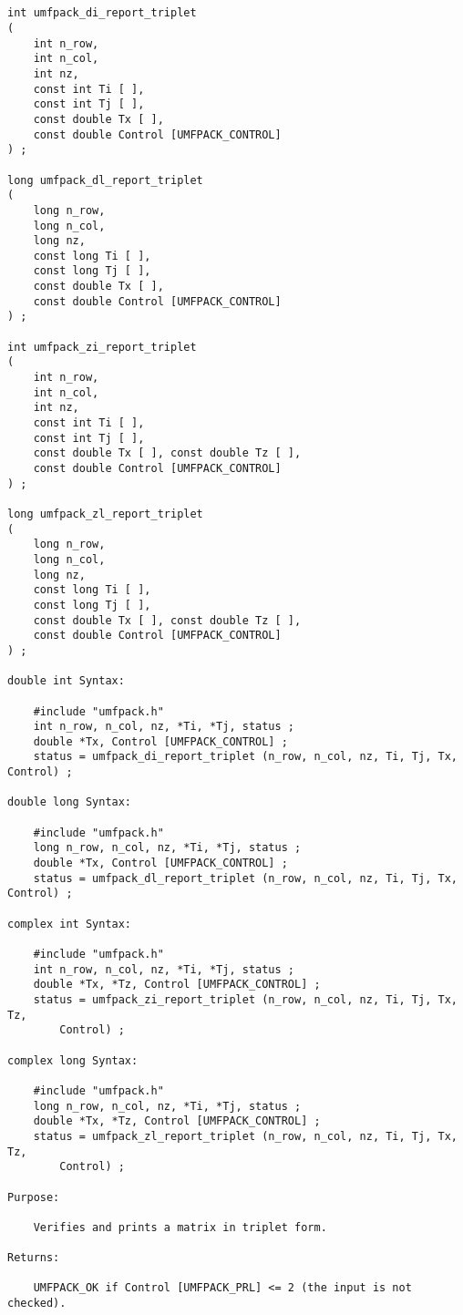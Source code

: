 {\footnotesize
\begin{verbatim}


int umfpack_di_report_triplet
(
    int n_row,
    int n_col,
    int nz,
    const int Ti [ ],
    const int Tj [ ],
    const double Tx [ ],
    const double Control [UMFPACK_CONTROL]
) ;

long umfpack_dl_report_triplet
(
    long n_row,
    long n_col,
    long nz,
    const long Ti [ ],
    const long Tj [ ],
    const double Tx [ ],
    const double Control [UMFPACK_CONTROL]
) ;

int umfpack_zi_report_triplet
(
    int n_row,
    int n_col,
    int nz,
    const int Ti [ ],
    const int Tj [ ],
    const double Tx [ ], const double Tz [ ],
    const double Control [UMFPACK_CONTROL]
) ;

long umfpack_zl_report_triplet
(
    long n_row,
    long n_col,
    long nz,
    const long Ti [ ],
    const long Tj [ ],
    const double Tx [ ], const double Tz [ ],
    const double Control [UMFPACK_CONTROL]
) ;

double int Syntax:

    #include "umfpack.h"
    int n_row, n_col, nz, *Ti, *Tj, status ;
    double *Tx, Control [UMFPACK_CONTROL] ;
    status = umfpack_di_report_triplet (n_row, n_col, nz, Ti, Tj, Tx, Control) ;

double long Syntax:

    #include "umfpack.h"
    long n_row, n_col, nz, *Ti, *Tj, status ;
    double *Tx, Control [UMFPACK_CONTROL] ;
    status = umfpack_dl_report_triplet (n_row, n_col, nz, Ti, Tj, Tx, Control) ;

complex int Syntax:

    #include "umfpack.h"
    int n_row, n_col, nz, *Ti, *Tj, status ;
    double *Tx, *Tz, Control [UMFPACK_CONTROL] ;
    status = umfpack_zi_report_triplet (n_row, n_col, nz, Ti, Tj, Tx, Tz,
        Control) ;

complex long Syntax:

    #include "umfpack.h"
    long n_row, n_col, nz, *Ti, *Tj, status ;
    double *Tx, *Tz, Control [UMFPACK_CONTROL] ;
    status = umfpack_zl_report_triplet (n_row, n_col, nz, Ti, Tj, Tx, Tz,
        Control) ;

Purpose:

    Verifies and prints a matrix in triplet form.

Returns:

    UMFPACK_OK if Control [UMFPACK_PRL] <= 2 (the input is not checked).


\end{verbatim}}

